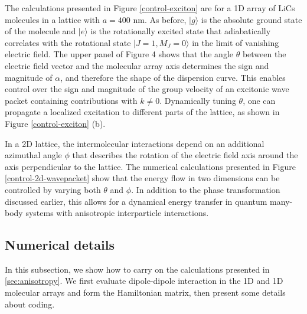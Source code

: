 The calculations presented in Figure \ref{control-exciton} are for a 1D array of LiCs molecules in a lattice with  $a=400$ nm.
As before, $|g\rangle$ is the absolute ground state of the molecule and $|e\rangle$ is the rotationally excited state
 that adiabatically correlates
with the rotational state $|J=1, M_J = 0 \rangle$ in the limit of vanishing electric field. 
The upper panel of Figure 4
shows that the angle $\theta$ between the electric field vector and the molecular array axis
determines the sign and magnitude of $\alpha$, and therefore the shape of the dispersion
curve. This enables
control over the sign and magnitude of the group velocity of an
excitonic wave packet containing contributions with $k\neq 0$. Dynamically tuning $\theta$,
one can propagate a localized excitation to different parts of the
lattice, as shown in Figure \ref{control-exciton} (b).

In a 2D lattice, the intermolecular interactions depend on an additional azimuthal angle $\phi$ that describes
 the rotation of the electric field axis around the axis perpendicular to the lattice. The numerical calculations 
presented in Figure \ref{control-2d-wavepacket} show that the energy flow in two dimensions can be  
controlled by varying both $\theta$ and $\phi$. 
In addition to the phase transformation discussed earlier, this allows for a dynamical energy transfer in quantum 
many-body systems with anisotropic interparticle interactions.

\subsection{Numerical details}
\label{sec:numerical}

In this subsection, we show how to carry on the calculations presented in \autoref{sec:anisotropy}. We first evaluate 
dipole-dipole interaction in the 1D and 1D molecular arrays and form the Hamiltonian
matrix, then present some  details about coding. 

